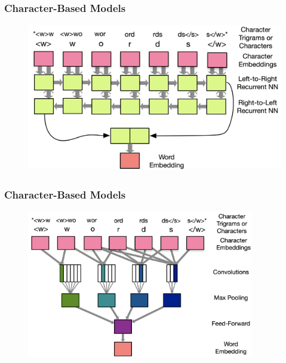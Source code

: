 \documentclass[usenames,dvipsnames]{beamer}
\begin{document}
\begin{frame}
  \frametitle{Character-Based Models}
  \begin{figure}
    \centering
    \includegraphics[height=6.5cm, valign=c]{assets/char_interpolate}
  \end{figure}
\end{frame}

\begin{frame}
  \frametitle{Character-Based Models}
  \begin{figure}
    \centering
    \includegraphics[height=6.5cm, valign=c]{assets/char_conv}
  \end{figure}
\end{frame}
\end{document}
